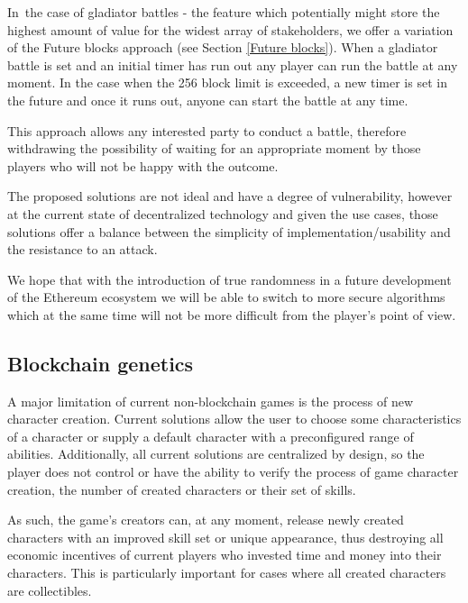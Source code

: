 \documentclass[12pt]{article}
\begin{document}
In\ the case of gladiator battles - the feature which potentially might store the highest amount of value for the widest array of stakeholders, we offer a variation of the Future blocks approach (see Section  \ref{Future blocks}). When a gladiator battle is set and an initial timer has run out any player can run the battle at any moment. In the case when the 256 block limit is exceeded, a new timer is set in the future and once it runs out, anyone can start the battle at any time.\par

This approach allows any interested party to conduct a battle, therefore withdrawing the possibility of waiting for an appropriate moment by those players who will not be happy with the outcome.\par


\vspace{\baselineskip}
The proposed solutions are not ideal and have a degree of vulnerability, however at the current state of decentralized technology and given the use cases, those solutions offer a balance between the simplicity of implementation/usability and the resistance to an attack.\par

We hope that with the introduction of true randomness in a future development of the Ethereum ecosystem we will be able to switch to more secure algorithms which at the same time will not be more difficult from the player’s point of view.\par

\subsection{Blockchain genetics}
  \label{Blockchain genetics}  \par

A major limitation of current non-blockchain games is the process of new character creation. Current solutions allow the user to choose some characteristics of a character or supply a default character with a preconfigured range of abilities. Additionally, all current solutions are centralized by design, so the player does not control or have the ability to verify the process of game character creation, the number of created characters or their set of skills.\par

As such, the game’s creators can, at any moment, release newly created characters with an improved skill set or unique appearance, thus destroying all economic incentives of current players who invested time and money into their characters. This is particularly important for cases where all created characters are collectibles.\par
\end{document}
